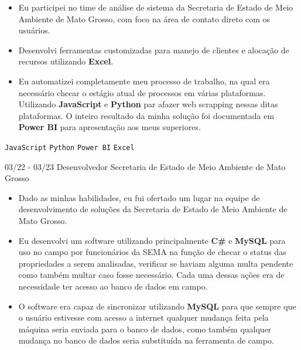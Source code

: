 \documentclass[9pt]{developercv}
\begin{document}
\begin{entrylist}
{        \begin{itemize}[noitemsep,topsep=0pt,parsep=0pt,partopsep=0pt, leftmargin=-1pt]
            \item {Eu participei no time de análise de sistema da Secretaria de Estado de Meio Ambiente de Mato Grosso, com foco na área de contato direto com os usuários.}
            \vspace{0.25pt}
            \item {Desenvolvi ferramentas customizadas para manejo de clientes e alocação de recursos utilizando \textbf{Excel}.}
            \vspace{0.25pt}
            \item {Eu automatizei completamente meu processo de trabalho, na qual era necessário checar o estágio atual de processos em várias plataformas. Utilizando \textbf{JavaScript} e \textbf{Python} par afazer web scrapping nessas ditas plataformas. O inteiro resultado da minha solução foi documentada em \textbf{Power BI} para apresentação aos meus superiores.}
        \end{itemize} 
        \texttt{JavaScript} \slashsep \texttt{Python} \slashsep \texttt{Power BI} \slashsep \texttt{Excel}}
        \entry
		{03/22 - 03/23}
		{\normalsize Desenvolvedor}
		{\normalsize Secretaria de Estado de Meio Ambiente de Mato Grosso}
		{\vspace{-10pt}
        \vspace{0.25pt}
        \begin{itemize}[noitemsep,topsep=0pt,parsep=0pt,partopsep=0pt, leftmargin=-1pt]
            \item {Dado as minhas habilidades, eu fui ofertado um lugar na equipe de desenvolvimento de soluções da Secretaria de Estado de Meio Ambiente de Mato Grosso.}
            \vspace{0.25pt}
            \item {Eu desenvolvi um software utilizando principalmente \textbf{C\#} e \textbf{MySQL} para uso no campo por funcionários da SEMA na função de checar o status das propriedades a serem analisadas, verificar se haviam alguma multa pendente como também multar caso fosse necessário. Cada uma dessas ações era de necessidade ter acesso ao banco de dados em campo.}
            \vspace{0.25pt}
            \item {O software era capaz de sincronizar utilizando \textbf{MySQL} para que sempre que o usuário estivesse com acesso a internet qualquer mudança feita pela máquina seria enviada para o banco de dados, como também qualquer mudança no banco de dados seria substituída na ferramenta de campo.}

\end{itemize}}
\end{entrylist}
\end{document}
